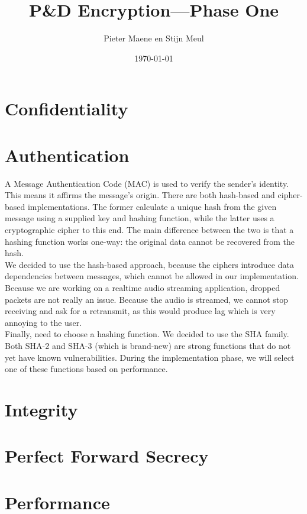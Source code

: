 \documentclass[a4paper]{article}
\title{P\&D Encryption---Phase One}
\author{Pieter Maene en Stijn Meul}
\date{\today}
\begin{document}
\maketitle

\section{Confidentiality}

\section{Authentication}

A Message Authentication Code (MAC) is used to verify the sender's identity. This means it affirms the message's origin. There are both hash-based and cipher-based implementations. The former calculate a unique hash from the given message using a supplied key and hashing function, while the latter uses a cryptographic cipher to this end. The main difference between the two is that a hashing function works one-way: the original data cannot be recovered from the hash.\\

We decided to use the hash-based approach, because the ciphers introduce data dependencies between messages, which cannot be allowed in our implementation. Because we are working on a realtime audio streaming application, dropped packets are not really an issue. Because the audio is streamed, we cannot stop receiving and ask for a retransmit, as this would produce lag which is very annoying to the user.\\

Finally, need to choose a hashing function. We decided to use the SHA family. Both SHA-2 and SHA-3 (which is brand-new) are strong functions that do not yet have known vulnerabilities. During the implementation phase, we will select one of these functions based on performance.

\section{Integrity}

\section{Perfect Forward Secrecy}

\section{Performance}
\end{document}
